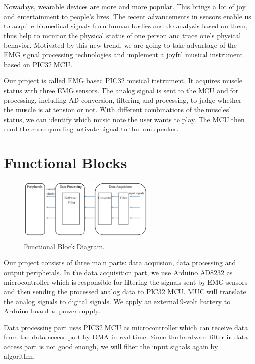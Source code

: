 \documentclass[12pt]{article}
\begin{document}
Nowadays, wearable devices are more and more popular. This brings a lot of joy and entertainment to people’s lives. The recent advancements in sensors enable us to acquire biomedical signals from human bodies and do analysis based on them, thus help to monitor the physical status of one person and trace one’s physical behavior. Motivated by this new trend, we are going to take advantage of the EMG signal processing technologies and implement a joyful musical instrument based on PIC32 MCU. 

Our project is called EMG based PIC32 musical instrument. It acquires muscle status with three EMG sensors. The analog signal is sent to the MCU and for processing, including AD conversion, filtering and processing, to judge whether the muscle is at tension or not. With different combinations of the muscles’ status, we can identify which music note the user wants to play. The MCU then send the corresponding activate signal to the loudspeaker.


\section{Functional Blocks}
\begin{figure}[H]
\centering
\includegraphics[width=0.6\textwidth]{block-diagram.png}
\caption{Functional Block Diagram.}
\end{figure}

Our project consists of three main parts: data acquision, data processing and output peripherals. In the data acquisition part, we use Arduino AD8232 as microcontroller which is responsible for filtering the signals sent by EMG sensors and then sending the processed analog data to PIC32 MCU. MUC will translate the analog signals to digital signals. We apply an external 9-volt battery to Arduino board as power supply.

Data processing part uses PIC32 MCU as microcontroller which can receive data from the data access part by DMA in real time. Since the hardware filter in data access part is not good enough, we will filter the input signals again by algorithm.
\end{document}
